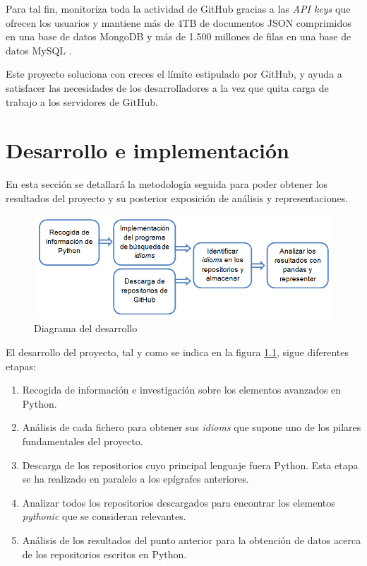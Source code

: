 \documentclass[a4paper, 12pt]{book}
\begin{document}
Para tal fin, monitoriza toda la actividad de GitHub gracias a las \textit{API keys} que ofrecen los usuarios y mantiene más de 4TB de documentos JSON comprimidos en una base de datos MongoDB y más de 1.500 millones de filas en una base de datos MySQL \cite{Gousi13}.

Este proyecto soluciona con creces el límite estipulado por GitHub, y ayuda a satisfacer las necesidades de los desarrolladores a la vez que quita carga de trabajo a los servidores de GitHub.


\cleardoublepage
\chapter{Desarrollo e implementación}

En esta sección se detallará la metodología seguida para poder obtener los resultados del proyecto y su posterior exposición de análisis y representaciones.

\begin{figure}[h]
\centering
\includegraphics[width=160mm]{img/diagrama.png}
\caption{Diagrama del desarrollo}
\label{fig:diagrama}
\end{figure}

El desarrollo del proyecto, tal y como se indica en la figura \ref{fig:diagrama}, sigue diferentes etapas:
\begin{enumerate}
    \item Recogida de información e investigación sobre los elementos avanzados en Python.
    \item Análisis de cada fichero para obtener sus \textit{idioms} que supone uno de los pilares fundamentales del proyecto.
    \item Descarga de los repositorios cuyo principal lenguaje fuera Python. Esta etapa se ha realizado en paralelo a los epígrafes anteriores.
    \item Analizar todos los repositorios descargados para encontrar los elementos \textit{pythonic} que se consideran relevantes.
    \item Análisis de los resultados del punto anterior para la obtención de datos acerca de los repositorios escritos en Python.
\end{enumerate}
\end{document}
